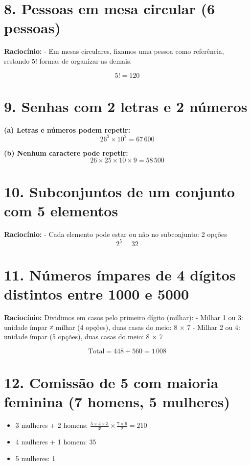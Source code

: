 \documentclass[12pt,a4paper]{article}
\begin{document}
\section*{8. Pessoas em mesa circular (6 pessoas)}

\textbf{Raciocínio:}  
- Em mesas circulares, fixamos uma pessoa como referência, restando \(5!\) formas de organizar as demais.  

\[
5! = 120
\]

\section*{9. Senhas com 2 letras e 2 números}

\textbf{(a) Letras e números podem repetir:}  
\[
26^2 \times 10^2 = 67\,600
\]

\textbf{(b) Nenhum caractere pode repetir:}  
\[
26 \times 25 \times 10 \times 9 = 58\,500
\]

\section*{10. Subconjuntos de um conjunto com 5 elementos}

\textbf{Raciocínio:}  
- Cada elemento pode estar ou não no subconjunto: 2 opções  
\[
2^5 = 32
\]

\section*{11. Números ímpares de 4 dígitos distintos entre 1000 e 5000}

\textbf{Raciocínio:}  
Dividimos em casos pelo primeiro dígito (milhar):  
- Milhar 1 ou 3: unidade ímpar ≠ milhar (4 opções), duas casas do meio: 8 × 7  
- Milhar 2 ou 4: unidade ímpar (5 opções), duas casas do meio: 8 × 7  

\[
\text{Total} = 448 + 560 = 1\,008
\]

\section*{12. Comissão de 5 com maioria feminina (7 homens, 5 mulheres)}

\begin{itemize}
    \item 3 mulheres + 2 homens: \( \frac{5 \times 4 \times 3}{3!} \times \frac{7 \times 6}{2} = 210 \)  
    \item 4 mulheres + 1 homem: 35  
    \item 5 mulheres: 1
\end{itemize}
\end{document}
